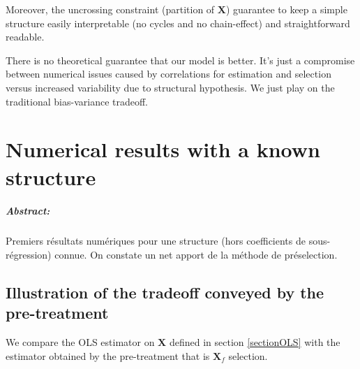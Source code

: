 \documentclass[12pt,a4paper]{report}
\begin{document}
Moreover, the uncrossing constraint (partition of $\boldsymbol{X}$) guarantee to keep a simple structure easily interpretable (no cycles and no chain-effect) and straightforward readable.

	
			There is no theoretical guarantee that our model is better. It's just a compromise between numerical issues caused by correlations for estimation and selection versus increased variability due to structural hypothesis. We just play on the traditional bias-variance tradeoff.
\chapter{Numerical results with a known structure}	
\paragraph{Abstract:} Premiers résultats numériques pour une structure (hors coefficients de sous-régression) connue. On constate un net apport de la méthode de préselection.
		 
	\section{Illustration of the tradeoff conveyed by the pre-treatment}	
	We compare the OLS estimator on $\boldsymbol{X}$ defined in section \ref{sectionOLS} with the estimator obtained by the pre-treatment that is $\boldsymbol{X}_f$ selection.
  
\end{document}
